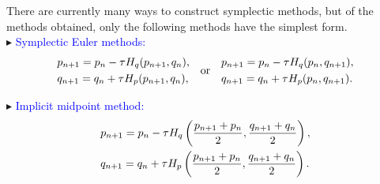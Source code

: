 \documentclass[10pt]{beamer}
\begin{document}
\begin{frame}
There are currently many ways to construct symplectic methods, but of the methods obtained, only the following methods have the simplest form.\\
\vspace{4mm}
\textcolor[rgb]{0,0,1}{$\blacktriangleright$} \textcolor{blue}{Symplectic Euler methods:}
\begin{align}\label{eq-5}
\aligned
&p_{n+1}=p_n-\tau H_q(p_{n+1},q_n),\\
&q_{n+1}=q_n+\tau H_p(p_{n+1},q_n),\\
\endaligned
\quad\mbox{or}\quad
\aligned
&p_{n+1}=p_n-\tau H_q(p_n,q_{n+1}),\\
&q_{n+1}=q_n+\tau H_p(p_n,q_{n+1}).\\
\endaligned
\end{align}

\textcolor[rgb]{0,0,1}{$\blacktriangleright$} \textcolor{blue}{Implicit midpoint method:}
\begin{align}\label{eq-6}
\aligned
&p_{n+1}=p_n-\tau H_q\left(\frac{p_{n+1}+p_n}{2},\frac{q_{n+1}+q_n}{2}\right),\\
&q_{n+1}=q_n+\tau H_p\left(\frac{p_{n+1}+p_n}{2},\frac{q_{n+1}+q_n}{2}\right).\\
\endaligned
\end{align}	
\end{frame}	
\end{document}
